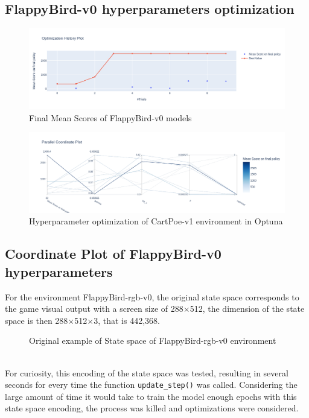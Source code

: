 \documentclass[11pt,a4paper,twocolumn]{IEEEtran}
\begin{document}
		\subsection{\textbf{FlappyBird-v0 hyperparameters optimization}}\vspace*{-.5cm}
		\begin{figure}[h]
			\centering\includegraphics[width=1\linewidth]{../imgs/optuna_fbv0_1}\vspace*{-.7cm}
			\caption{Final Mean Scores of FlappyBird-v0 models}
			\label{fig:fbv01opt}
		\end{figure}
	\begin{figure}[h]
		\centering\includegraphics[width=1\linewidth]{../imgs/optuna_fbv0_2}\vspace*{-.0cm}
		\caption{Hyperparameter optimization of CartPoe-v1 environment in Optuna}
		\label{fig:fbv02opt}
	\end{figure}
		\newpage
		\subsection{\textbf{Coordinate Plot of FlappyBird-v0 hyperparameters}}
		\label{section:aprgb}
		For the environment FlappyBird-rgb-v0, the original state space corresponds to the game visual output with a screen size of 288$\times$512, the dimension of the state space is then 288$\times$512$\times$3, that is 442,368.\vspace*{-1cm}\\
		\begin{figure}[h]
			\centering
			\vspace*{-.7cm}
			\caption{Original example of State space of FlappyBird-rgb-v0 environment}
		\end{figure}\\
		For curiosity, this encoding of the state space was tested, resulting in several seconds for every time the function \texttt{update\_step()} was called. Considering the large amount of time it would take to train the model enough epochs with this state space encoding, the process was killed and optimizations were considered.\medskip\\
		
\end{document}
